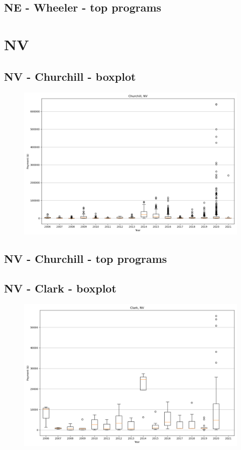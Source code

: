 \subsection*{NE - Wheeler - top programs}

\newpage
\section*{NV}
\subsection*{NV - Churchill - boxplot}
\begin{figure}[h]
\centering
\includegraphics[width=7in]{../output/boxplots/counties/Churchill-NV_boxplot.png}
\end{figure}


\subsection*{NV - Churchill - top programs}

\newpage
\subsection*{NV - Clark - boxplot}
\begin{figure}[h]
\centering
\includegraphics[width=7in]{../output/boxplots/counties/Clark-NV_boxplot.png}
\end{figure}


